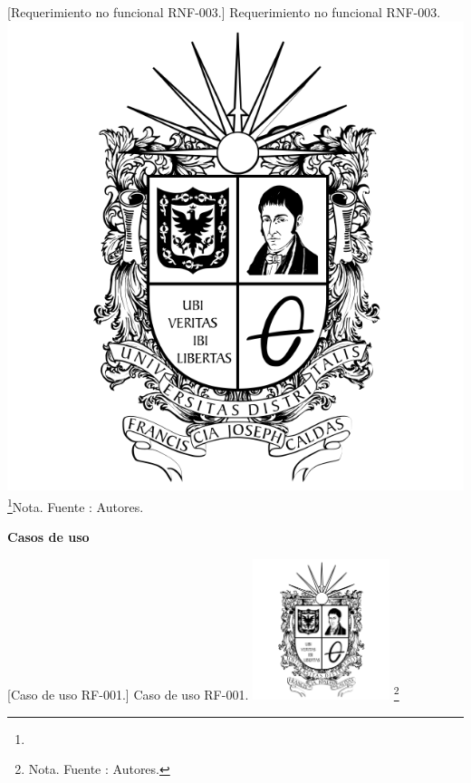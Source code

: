 {\begin{enumerate}
        \vspace{2mm}
        \begin{minipage}{0.9\textwidth}
        \centering
        [{Requerimiento no funcional RNF-003.}]{ Requerimiento no funcional RNF-003. }
        \label{reqnf3}
        \includegraphics[width=1\textwidth]{Content/Images/Escudo_UD.png}
        \footnote{}{Nota. \textup{Fuente : Autores.}}
        \end{minipage}
        
\end{enumerate}

\textbf{Casos de uso}
    
    \vspace{2mm}
    \begin{minipage}{0.9\textwidth}
    \centering
    [{Caso de uso RF-001.}]{ Caso de uso RF-001. }
    \label{caso1}
    \includegraphics[width=0.3\textwidth]{Content/Images/Escudo_UD.png}
    \footnote{Nota. \textup{Fuente : Autores.}}
    \end{minipage}
    
}

